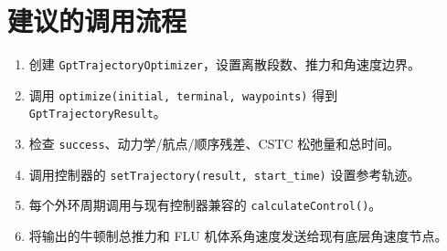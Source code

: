 \documentclass[UTF8,a4paper,11pt]{ctexart}
\begin{document}
\section{建议的调用流程}

\begin{enumerate}
  \item 创建 \texttt{GptTrajectoryOptimizer}，设置离散段数、推力和角速度边界。
  \item 调用 \texttt{optimize(initial, terminal, waypoints)} 得到
  \texttt{GptTrajectoryResult}。
  \item 检查 \texttt{success}、动力学/航点/顺序残差、CSTC 松弛量和总时间。
  \item 调用控制器的
  \texttt{setTrajectory(result, start\_time)} 设置参考轨迹。
  \item 每个外环周期调用与现有控制器兼容的 \texttt{calculateControl()}。
  \item 将输出的牛顿制总推力和 FLU 机体系角速度发送给现有底层角速度节点。
\end{enumerate}
\end{document}
